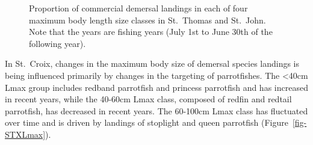 \documentclass[
  letterpaper,
  oneside,
  open=any]{scrbook}
\begin{document}
\begin{figure}


\caption{\label{fig-STTLmax}Proportion of commercial demersal landings
in each of four maximum body length size classes in St.~Thomas and
St.~John. Note that the years are fishing years (July 1st to June 30th
of the following year).}

\end{figure}%

In St.~Croix, changes in the maximum body size of demersal species
landings is being influenced primarily by changes in the targeting of
parrotfishes. The \textless40cm Lmax group includes redband parrotfish
and princess parrotfish and has increased in recent years, while the
40-60cm Lmax class, composed of redfin and redtail parrotfish, has
decreased in recent years. The 60-100cm Lmax class has fluctuated over
time and is driven by landings of stoplight and queen parrotfish
(Figure~\ref{fig-STXLmax}).
\end{document}

